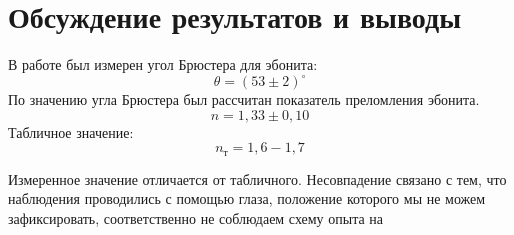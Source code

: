\documentclass[a4paper, 12pt]{article}
\begin{document}
%
%
%


\section{Обсуждение результатов и выводы}
В работе был измерен угол Брюстера для эбонита:
\[
    \theta = (53\pm 2)^\circ
\]
По значению угла Брюстера был рассчитан показатель преломления эбонита.
\[
    n=1,33\pm 0,10
\]
Табличное значение:
\[
    n_{\text{т}} = 1,6-1,7
\]

Измеренное значение отличается от табличного. Несовпадение связано с
тем, что наблюдения проводились с помощью глаза, положение которого мы
не можем зафиксировать, соответственно не соблюдаем схему опыта на 
\end{document}
